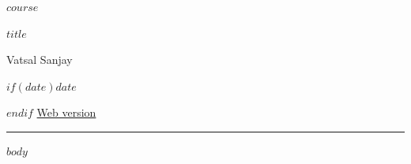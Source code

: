 \documentclass[11pt,a4paper]{article}
\begin{document}
{\sffamily\small\color{accent}$course$\par}
\vspace{3mm}
{\LARGE\bfseries $title$\par}
\vspace{3mm}
{\large Vatsal Sanjay\par}
$if(date)$$date$\par$endif$
\smallskip\href{$web-url$}{Web version}\par
\vspace{3mm}\hrule\vspace{4mm}
$body$
\end{document}
